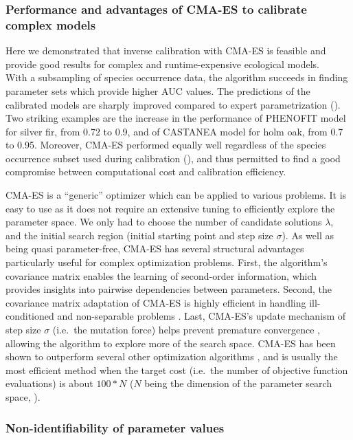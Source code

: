 \subsubsection{Performance and advantages of CMA-ES to calibrate
complex models}\label{performance-and-advantages-of-cma-es-to-calibrate-complex-models-in-ecology}

Here we demonstrated that inverse calibration with CMA-ES is feasible
and provide good results for complex and runtime-expensive ecological
models.\\
With a subsampling of species occurrence data, the algorithm succeeds in
finding parameter sets which provide higher AUC values. The predictions
of the calibrated models are sharply improved compared to expert
parametrization (). Two striking examples are the
increase in the performance of PHENOFIT model for silver fir, from 0.72
to 0.9, and of CASTANEA model for holm oak, from 0.7 to 0.95. Moreover,
CMA-ES performed equally well regardless of the species occurrence
subset used during calibration
(), and thus permitted to find
a good compromise between computational cost and calibration efficiency.

CMA-ES is a ``generic'' optimizer which can be applied to various
problems. It is easy to use as it does not require an extensive tuning
to efficiently explore the parameter space. We only had to choose the
number of candidate solutions \(\lambda\), and the initial search region
(initial starting point and step size \(\sigma\)). As well as being
quasi parameter-free, CMA-ES has several structural advantages
particularly useful for complex optimization problems. First, the
algorithm's covariance matrix enables the learning of second-order
information, which provides insights into pairwise dependencies between
parameters. Second, the covariance matrix adaptation of CMA-ES is highly
efficient in handling ill-conditioned and non-separable problems
\citep{Hansen2011}. Last,
CMA-ES's update mechanism of step size \(\sigma\) (i.e.~the mutation
force) helps prevent premature convergence
\citep{Hansen2001},
allowing the algorithm to explore more of the search space. CMA-ES has
been shown to outperform several other optimization algorithms
\citep{Hansen2010}, and is
usually the most efficient method when the target cost (i.e.~the number
of objective function evaluations) is about \(100*N\) (\(N\) being the
dimension of the parameter search space,
\citealp{Baeck2013}).

\subsubsection{Non-identifiability of parameter values}\label{non-identifiability-of-parameter-values}

